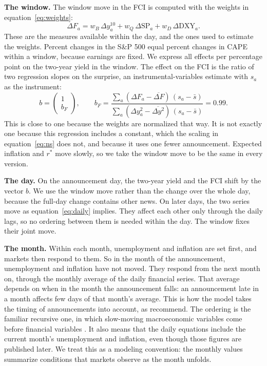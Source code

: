 \documentclass[11pt]{article}
\newcommand{\rs}{r^{*}}
\begin{document}
\textbf{The window.} The window move in the FCI is computed with the weights in equation~\eqref{eq:weights}:
\begin{equation}
\Delta F_a = w_B\, \Delta y^{10}_a + w_Q\, \Delta \text{SP}_a + w_D\, \Delta \text{DXY}_a. \label{eq:winfci}
\end{equation}
These are the measures available within the day, and the ones used to estimate the weights. Percent changes in the S\&P 500 equal percent changes in CAPE within a window, because earnings are fixed. We express all effects per percentage point on the two-year yield in the window. The effect on the FCI is the ratio of two regression slopes on the surprise, an instrumental-variables estimate with $s_a$ as the instrument:
\begin{equation}
b = \begin{pmatrix} 1 \\ b_F \end{pmatrix}, \qquad b_F = \frac{\sum_a (\Delta F_a - \overline{\Delta F})\,(s_a-\bar s)}{\sum_a (\Delta y^{2}_a - \overline{\Delta y^{2}})\,(s_a-\bar s)} = 0.99. \label{eq:impact}
\end{equation}
This is close to one because the weights are normalized that way. It is not exactly one because this regression includes a constant, which the scaling in equation~\eqref{eq:ns} does not, and because it uses one fewer announcement. Expected inflation and $\rs$ move slowly, so we take the window move to be the same in every version.

\textbf{The day.} On the announcement day, the two-year yield and the FCI shift by the vector $b$. We use the window move rather than the change over the whole day, because the full-day change contains other news. On later days, the two series move as equation~\eqref{eq:daily} implies. They affect each other only through the daily lags, so no ordering between them is needed within the day. The window fixes their joint move.

\textbf{The month.} Within each month, unemployment and inflation are set first, and markets then respond to them. So in the month of the announcement, unemployment and inflation have not moved. They respond from the next month on, through the monthly average of the daily financial series. That average depends on when in the month the announcement falls: an announcement late in a month affects few days of that month's average. This is how the model takes the timing of announcements into account, as \citet{jacobson2026} recommend. The ordering is the familiar recursive one, in which slow-moving macroeconomic variables come before financial variables \citep{bernanke1992,christiano1999}. It also means that the daily equations include the current month's unemployment and inflation, even though those figures are published later. We treat this as a modeling convention: the monthly values summarize conditions that markets observe as the month unfolds.
\end{document}
